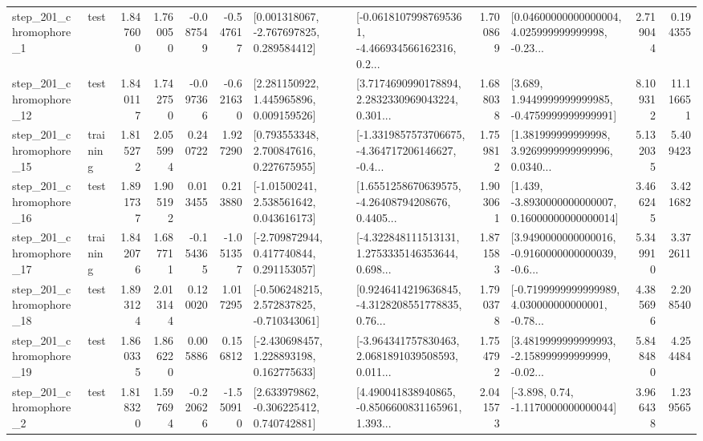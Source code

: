 \begin{tabular}{llrrrrllrlrr}
   step\_201\_chromophore\_1 &      test &      1.847600 &    1.760050 &     -0.087549 & -0.547617 &    [0.001318067, -2.767697825, 0.289584412] &  [-0.06181079987695361, -4.466934566162316, 0.2... &       1.700869 &  [0.04600000000000004, 4.025999999999998, -0.23... &            2.719044 &          0.194355 \\
  step\_201\_chromophore\_12 &      test &      1.840117 &    1.742750 &     -0.097366 & -0.621630 &     [2.281150922, 1.445965896, 0.009159526] &  [3.7174690990178894, 2.2832330969043224, 0.301... &       1.688038 &   [3.689, 1.9449999999999985, -0.4759999999999991] &            8.109312 &         11.116651 \\
  step\_201\_chromophore\_15 &  training &      1.815272 &    2.055994 &      0.240722 &  1.927290 &     [0.793553348, 2.700847616, 0.227675955] &  [-1.3319857573706675, -4.364717206146627, -0.4... &       1.759812 &  [1.381999999999998, 3.9269999999999996, 0.0340... &            5.132035 &          5.409423 \\
  step\_201\_chromophore\_16 &      test &      1.891737 &    1.905192 &      0.013455 &  0.213880 &     [-1.01500241, 2.538561642, 0.043616173] &  [1.6551258670639575, -4.26408794208676, 0.4405... &       1.903061 &  [1.439, -3.8930000000000007, 0.16000000000000014] &            3.466245 &          3.421682 \\
  step\_201\_chromophore\_17 &  training &      1.842076 &    1.687711 &     -0.154365 & -1.051357 &    [-2.709872944, 0.417740844, 0.291153057] &  [-4.322848111513131, 1.2753335146353644, 0.698... &       1.871583 &  [3.9490000000000016, -0.9160000000000039, -0.6... &            5.349910 &          3.372611 \\
  step\_201\_chromophore\_18 &      test &      1.893124 &    2.013144 &      0.120020 &  1.017295 &   [-0.506248215, 2.572837825, -0.710343061] &  [0.9246414219636845, -4.3128208551778835, 0.76... &       1.790378 &  [-0.7199999999999989, 4.030000000000001, -0.78... &            4.385696 &          2.208540 \\
  step\_201\_chromophore\_19 &      test &      1.860335 &    1.866220 &      0.005886 &  0.156812 &    [-2.430698457, 1.228893198, 0.162775633] &  [-3.964341757830463, 2.0681891039508593, 0.011... &       1.754792 &  [3.4819999999999993, -2.158999999999999, -0.02... &            5.848480 &          4.254484 \\
   step\_201\_chromophore\_2 &      test &      1.818320 &    1.597694 &     -0.220626 & -1.550910 &    [2.633979862, -0.306225412, 0.740742881] &  [4.490041838940865, -0.8506600831165961, 1.393... &       2.041573 &                [-3.898, 0.74, -1.1170000000000044] &            3.966438 &          1.239565 \\

\end{tabular}
